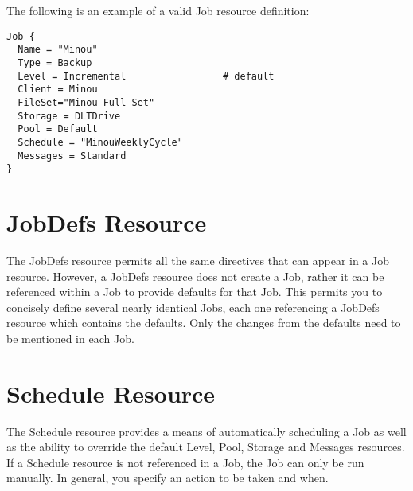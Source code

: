 The following is an example of a valid Job resource definition:

\footnotesize
\begin{verbatim}
Job {
  Name = "Minou"
  Type = Backup
  Level = Incremental                 # default
  Client = Minou
  FileSet="Minou Full Set"
  Storage = DLTDrive
  Pool = Default
  Schedule = "MinouWeeklyCycle"
  Messages = Standard
}
\end{verbatim}
\normalsize

\section{JobDefs Resource}
\label{JobDefsResource}

The JobDefs resource permits all the same directives that can appear in a Job
resource. However, a JobDefs resource does not create a Job, rather it can be
referenced within a Job to provide defaults for that Job. This permits you to
concisely define several nearly identical Jobs, each one referencing a JobDefs
resource which contains the defaults. Only the changes from the defaults need to
be mentioned in each Job.

\section{Schedule Resource}
\label{ScheduleResource}

The Schedule resource provides a means of automatically scheduling a Job as
well as the ability to override the default Level, Pool, Storage and Messages
resources. If a Schedule resource is not referenced in a Job, the Job can only
be run manually. In general, you specify an action to be taken and when.

